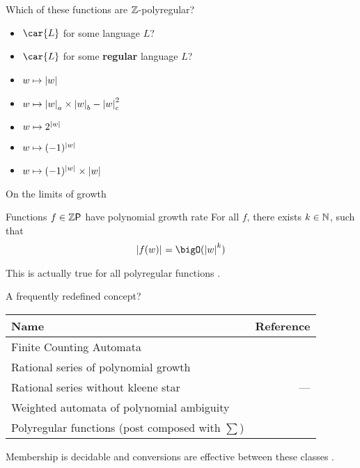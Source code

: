 \documentclass{beamer}
\begin{document}
\begin{frame}{Which of these functions are $\mathbb{Z}$-polyregular?}
    \begin{itemize}
        \item $\car{L}$ for some language $L$? 
            \pause \hfill \nokmark
        \item $\car{L}$ for some \textbf{regular} language $L$? 
            \pause \hfill \okmark
        \item $w \mapsto \size{w}$
            \pause \hfill \okmark
        \item $w \mapsto \size[a]{w} \times \size[b]{w} - \size[c]{w}^2$
            \pause \hfill \okmark
        \item $w \mapsto 2^{\size{w}}$
            \pause \hfill \nokmark
        \item $w \mapsto (-1)^{\size{w}}$
            \pause \hfill \okmark
        \item $w \mapsto (-1)^{\size{w}} \times |w|$
            \pause \hfill \okmark
    \end{itemize}
\end{frame}

\begin{frame}{On the limits of growth}
    \begin{block}{Functions $f \in \Zpoly$ have polynomial growth rate}
        For all $f$, there exists $k \in \mathbb{N}$, such that
        \begin{equation*}
            \size{f(w)} = \bigO(\size{w}^k)
        \end{equation*}
    \end{block}
    \pause
    This is actually true for all polyregular functions 
    \cite{bojanczyk2019string}.
\end{frame}

\begin{frame}{A frequently redefined concept?}
    \begin{center}
        \begin{tabular}{lr}
            \toprule
            \textbf{Name} & \textbf{Reference} \\
            \midrule
            Finite Counting Automata & \cite{schutzenberger1962} \\
            Rational series of polynomial growth & \cite{berstel2011noncommutative} \\
            Rational series without kleene star &  --- \\
            Weighted automata of polynomial ambiguity & \cite{kreutzer2013,poly:CDL23} \\
            Polyregular functions
            (post composed with $\sum$) & \cite{bojanczyk2019string} \\
            \bottomrule
        \end{tabular}
    \end{center}
    Membership is decidable and conversions are effective
    between these classes \cite[see, e.g.][]{poly:CDL23}.
\end{frame}
\end{document}
